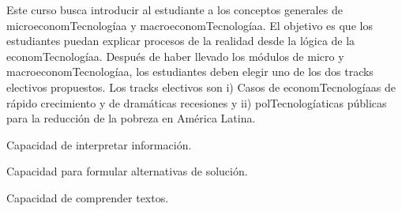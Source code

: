 \begin{syllabus}


\begin{justification}
Este curso busca introducir al estudiante a los conceptos generales de microeconomTecnologíaa y macroeconomTecnologíaa. El objetivo es que los estudiantes puedan explicar procesos de la realidad desde la lógica de la economTecnologíaa. Después de haber llevado los módulos de micro y macroeconomTecnologíaa, los estudiantes deben elegir uno de los dos tracks electivos propuestos.
Los tracks electivos son i) Casos de economTecnologíaas de rápido crecimiento y de dramáticas recesiones y ii) polTecnologíaticas públicas para la reducción de la pobreza en América Latina.
\end{justification}

\begin{goals}
\item Capacidad de interpretar información.
\item Capacidad para formular alternativas de solución.
\item Capacidad de comprender textos.
\end{goals}

\begin{outcomes}
    \item {} %
    \item {} %
    \item {} %
    \item {} %

\end{outcomes}

\begin{competences}
    \item {}
    \item {}
    \item {}
    \item {}
\end{competences}


\end{syllabus}
